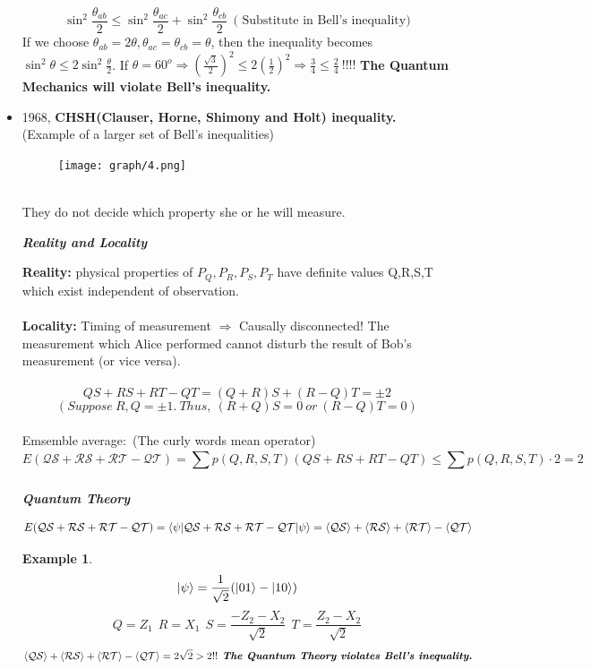 \documentclass[]{book}
\newtheorem*{example}{Example}
\theoremstyle{nonumberplain}
\begin{document}
\begin{itemize}
\[
	\sin^{2}{\frac{\theta_{ab}}{2}} \leq \sin^{2}{\frac{\theta_{ac}}{2}}+ \sin^{2}{\frac{\theta_{cb}}{2}}\ \ \text{( Substitute in Bell's inequality)}
\] 
If we choose $\theta_{ab} = 2\theta, \theta_{ac}=\theta_{cb}= \theta$, then the inequality becomes $\sin^{2}{\theta}\leq 2\sin^{2}{\frac{\theta}{2}}$. If $\theta = 60^{o} \Rightarrow \left(\frac{\sqrt{3}}{2}\right)^{2}\leq 2 \left(\frac{1}{2}\right)^{2}\Rightarrow \frac{3}{4}\leq \frac{2}{4}\ !!!!$ \textbf{The Quantum Mechanics will violate Bell's inequality.}\\
	\item 1968, \textbf{CHSH(Clauser, Horne, Shimony and Holt) inequality.} (Example of a larger set of Bell's inequalities) \\
\begin{figure}[h]
	\centering
	\texttt{[image: graph/4.png]}
\end{figure}
\\
They do not decide which property she or he will measure. 
\begin{center}
\textit{\textbf{Reality and Locality}}
\end{center}
\textbf{Reality:} physical properties of $P_{Q},P_{R},P_{S},P_{T}$ have definite values Q,R,S,T which exist independent of observation. \\
\\
\textbf{Locality:} Timing of measurement $\Rightarrow$ Causally disconnected! The measurement which Alice performed cannot disturb the result of Bob's measurement (or vice versa). 
\\ \\ 
\[
	QS+RS+RT-QT = (Q+R)S+(R-Q)T = \pm 2
\] 
\[
	(Suppose\ R,Q = \pm 1.\ Thus,\ (R+Q)S=0\ or\ (R-Q)T=0)
\] 
\\
Emsemble average:\ (The curly words mean operator)
\[
	E(\mathcal{QS+RS+RT-QT}) = \sum^{}_{} p(Q,R,S,T)(QS+RS+RT-QT) \leq \sum^{}_{} p(Q,R,S,T)\cdot2 = 2
\] 
\begin{center}
\textit{\textbf{Quantum Theory}}
\end{center}
\[
	E(\mathcal{QS+RS+RT-QT}) = \braket{\psi|\mathcal{QS+RS+RT-QT}|\psi} = \braket{\mathcal{QS}} + \braket{\mathcal{RS}} +\braket{\mathcal{RT}} - \braket{\mathcal{QT}} 
\] 
\begin{example}
\[
	\ket{\psi}=\frac{1}{\sqrt{2}}(\ket{01}-\ket{10})
\] 
\[
Q=Z_{1}\ \ R=X_{1}\ \  S= \frac{-Z_{2}-X_{2}}{\sqrt{2}}\ \ T= \frac{Z_{2}-X_{2}}{\sqrt{2}}
\] 
\[
\braket{\mathcal{QS}} + \braket{\mathcal{RS}}+ \braket{\mathcal{RT}} -\braket{\mathcal{QT}} = 2\sqrt{2} > 2 !!\textit{\textbf{ The Quantum Theory violates Bell's inequality.}}
\]
\end{example}
\end{itemize}
\end{document}
